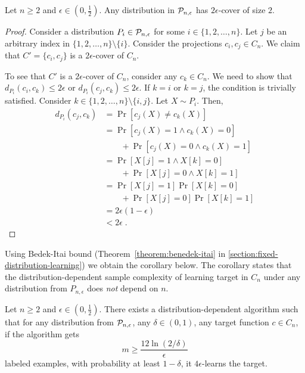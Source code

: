 \begin{lemma}
Let $n \ge 2$ and $\epsilon \in (0,\frac{1}{2})$. Any distribution in $\P_{n,\epsilon}$
has $2\epsilon$-cover of size $2$.
\end{lemma}

\begin{proof}
Consider a distribution $P_i \in \P_{n,\epsilon}$ for some $i \in \{1,2,\dots,n\}$.
Let $j$ be an arbitrary index in $\{1,2,\dots,n\} \setminus \{i\}$.
Consider the projections $c_i, c_j \in C_n$. We claim that $C' = \{c_i, c_j\}$
is a $2\epsilon$-cover of $C_n$.

To see that $C'$ is a $2\epsilon$-cover of $C_n$, consider any $c_k \in C_n$.
We need to show that $d_{P_i}(c_i, c_k) \le 2\epsilon$ or $d_{P_i}(c_j, c_k)
\le 2\epsilon$. If $k = i$ or $k = j$, the condition is trivially satisfied.
Consider $k \in \{1,2,\dots,n\} \setminus \{i,j\}$. Let $X \sim P_i$. Then,
\begin{align*}
d_{P_i}(c_j, c_k)
& = \Pr[c_j(X) \neq c_k(X)] \\
& = \Pr[c_j(X) = 1 \wedge c_k(X) = 0] \\
  & \qquad + \Pr[c_j(X) = 0 \wedge c_k(X) = 1] \\
& = \Pr[X[j] = 1 \wedge X[k] = 0]  \\
  & \qquad + \Pr[X[j] = 0 \wedge X[k] = 1] \\
& = \Pr[X[j] = 1] \Pr[X[k] = 0] \\
  & \qquad + \Pr[X[j] = 0] \Pr[X[k] = 1] \\
& = 2 \epsilon \left( 1 - \epsilon \right)  \\
& < 2 \epsilon \; .
\end{align*}
\end{proof}

Using Bedek-Itai bound (Theorem~\ref{theorem:benedek-itai} in
\autoref{section:fixed-distribution-learning}) we obtain the corollary below.
The corollary states that the distribution-dependent sample complexity
of learning target in $C_n$ under any distribution from $P_{n,\epsilon}$
does \emph{not} depend on $n$.

\begin{corollary}
Let $n \ge 2$ and $\epsilon \in (0,\frac{1}{2})$.  There exists a
distribution-dependent algorithm such that for any distribution from $\P_{n,\epsilon}$,
any $\delta \in (0,1)$, any target function $c \in C_n$, if the algorithm gets
$$
m \ge \frac{12\ln(2/\delta)}{\epsilon}
$$
labeled examples, with
probability at least $1 - \delta$, it $4\epsilon$-learns the target.
\end{corollary}

